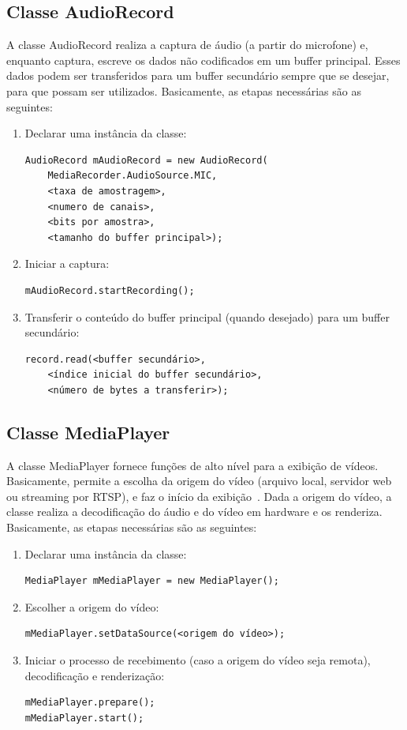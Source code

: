 \documentclass{acm_proc_article-sp}
\begin{document}
\subsection{Classe AudioRecord}
A classe AudioRecord realiza a captura de áudio (a partir do microfone) e, enquanto captura, escreve os dados não codificados em um buffer principal. Esses dados podem ser transferidos para um buffer secundário sempre que se desejar, para que possam ser utilizados. Basicamente, as etapas necessárias são as seguintes:
\begin{enumerate}
 \item Declarar uma instância da classe:
  \begin{verbatim}
AudioRecord mAudioRecord = new AudioRecord(
    MediaRecorder.AudioSource.MIC, 
    <taxa de amostragem>,
    <numero de canais>,
    <bits por amostra>,
    <tamanho do buffer principal>);
  \end{verbatim}
 \item Iniciar a captura:
  \begin{verbatim}
mAudioRecord.startRecording();
  \end{verbatim}
 \item Transferir o conteúdo do buffer principal (quando desejado) para um buffer secundário:
  \begin{verbatim}
record.read(<buffer secundário>,
    <índice inicial do buffer secundário>,
    <número de bytes a transferir>);
  \end{verbatim}
\end{enumerate}

\subsection{Classe MediaPlayer}
A classe MediaPlayer fornece funções de alto nível para a exibição de vídeos. Basicamente, permite a escolha da origem do vídeo (arquivo local, servidor web ou streaming por RTSP), e faz o início da exibição~\cite{pro_android}. Dada a origem do vídeo, a classe realiza a decodificação do áudio e do vídeo em hardware e os renderiza. Basicamente, as etapas necessárias são as seguintes:
\begin{enumerate}
 \item Declarar uma instância da classe:
  \begin{verbatim}
MediaPlayer mMediaPlayer = new MediaPlayer();
  \end{verbatim}
 \item Escolher a origem do vídeo:
  \begin{verbatim}
mMediaPlayer.setDataSource(<origem do vídeo>);
  \end{verbatim}
 \item Iniciar o processo de recebimento (caso a origem do vídeo seja remota), decodificação e renderização:
  \begin{verbatim}
mMediaPlayer.prepare();
mMediaPlayer.start();
  \end{verbatim}
\end{enumerate}
\end{document}
